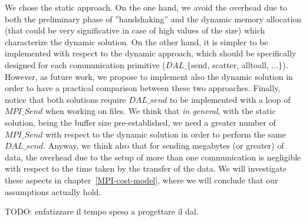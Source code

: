 We chose the static approach. On the one hand, we avoid the overhead due to both the preliminary phase of ''handshaking'' and the dynamic memory allocation (that could be very significative in case of high values of the size) which characterize the dynamic solution. On the other hand, it is simpler to be implemented with respect to the dynamic approach, which should be specifically designed for each communication primitive ($DAL\_\lbrace$send, scatter, alltoall, ...$\rbrace$). However, as future work, we propose to implement also the dynamic solution in order to have a practical comparison between these two approaches. Finally, notice that both solutions require $DAL\_send$ to be implemented with a loop of $MPI\_Send$ when working on files. We think that \textit{in general}, with the static solution, being the buffer size pre-established, we need a greater number of $MPI\_Send$ with respect to the dynamic solution in order to perform the same $DAL\_send$. Anyway, we think also that for sending megabytes (or greater) of data, the overhead due to the setup of more than one communication is negligible with respect to the time taken by the transfer of the data. We will investigate these aspects in chapter~\ref{MPI-cost-model}, where we will conclude that our assumptions actually hold.

TODO: enfatizzare il tempo speso a progettare il dal.

